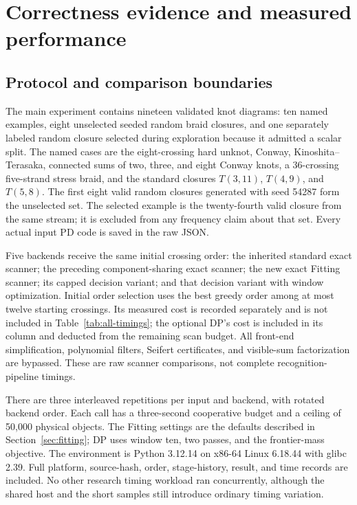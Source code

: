 \section{Correctness evidence and measured performance}
\label{sec:experiments}

\subsection{Protocol and comparison boundaries}
The main experiment contains nineteen validated knot diagrams: ten named
examples, eight unselected seeded random braid closures, and one separately
labeled random closure selected during exploration because it admitted a
scalar split. The named cases are the eight-crossing hard unknot, Conway,
Kinoshita--Terasaka, connected sums of two, three, and eight Conway knots, a
36-crossing five-strand stress braid, and the standard closures $T(3,11)$,
$T(4,9)$, and $T(5,8)$. The first eight valid random closures generated with
seed 54287 form the unselected set. The selected example is the twenty-fourth
valid closure from the same stream; it is excluded from any frequency claim
about that set. Every actual input PD code is saved in the raw JSON.

Five backends receive the same initial crossing order: the inherited
standard exact scanner; the preceding component-sharing exact scanner;
the new exact Fitting scanner; its capped decision variant; and that
decision variant with window optimization. Initial order selection uses the
best greedy order among at most twelve starting crossings. Its measured cost
is recorded separately and is not included in Table~\ref{tab:all-timings};
the optional DP's cost is included in its column and deducted from the
remaining scan budget. All front-end simplification, polynomial filters,
Seifert certificates, and visible-sum factorization are bypassed. These are
raw scanner comparisons, not complete recognition-pipeline timings.

There are three interleaved repetitions per input and backend, with rotated
backend order. Each call has a three-second cooperative budget and a ceiling
of 50,000 physical objects. The Fitting settings are the defaults described
in Section~\ref{sec:fitting}; DP uses window ten, two passes, and the
frontier-mass objective. The environment is Python 3.12.14 on x86-64 Linux
6.18.44 with glibc 2.39. Full platform, source-hash, order, stage-history,
result, and time records are included. No other research timing workload ran
concurrently, although the shared host and the short samples still introduce
ordinary timing variation.

